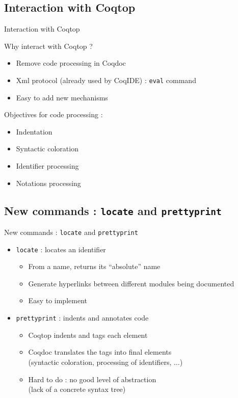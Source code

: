\documentclass[compress]{beamer}
\newenvironment{tframe}[1]{
  \subsection{#1}
  \begin{frame}{#1}
  }{
  \end{frame}
  }
\begin{document}
  \begin{tframe}{Interaction with Coqtop}
    Why interact with Coqtop ?
    \begin{itemize}
      \item Remove code processing in Coqdoc
      \item Xml protocol (already used by CoqIDE) : \texttt{eval} command
      \item Easy to add new mechanisms
    \end{itemize}
    \vfill
    Objectives for code processing :
    \begin{itemize}
      \item Indentation
      \item Syntactic coloration
      \item Identifier processing
      \item Notations processing %
    \end{itemize}
  \end{tframe}

  \begin{tframe}{New commands : \texttt{locate} and \texttt{prettyprint}}
    \begin{itemize}
      \item \texttt{locate} : locates an identifier
        \begin{itemize}
          \item From a name, returns its ``absolute'' name
          \item Generate hyperlinks between different modules being documented
          \item Easy to implement
        \end{itemize}
        \vfill
      \item \texttt{prettyprint} : indents and annotates code
        \begin{itemize}
          \item Coqtop indents and tags each element
          \item Coqdoc translates the tags into final elements \\
            \small (syntactic coloration, processing of identifiers, $\ldots$)
          \item Hard to do : no good level of abstraction \\
            \small (lack of a concrete syntax tree)
        \end{itemize}
    \end{itemize}
  \end{tframe}
\end{document}
